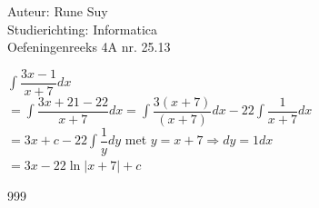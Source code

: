 \documentclass[a4paper]{article}
\newcommand{\Int}{\displaystyle\int}
\begin{document}
  
\noindent \large Auteur: Rune Suy \\
\noindent \large Studierichting: Informatica\\
\noindent \large Oefeningenreeks 4A nr. 25.13\\

\medskip

\normalsize

$\Int \dfrac{3x-1}{x+7}dx$\\

$= \Int \dfrac{3x+21-22}{x+7}dx = \Int \dfrac{3(x+7)}{(x+7)}dx - 22 \Int \dfrac{1}{x+7}dx$\\

$=3x + c - 22 \Int \dfrac{1}{y}dy$ met $y=x+7 \Rightarrow dy=1dx$ \\

$= 3x - 22 \ln |x+7| + c$\\

\begin{thebibliography}{999}
\end{thebibliography}
\end{document}
